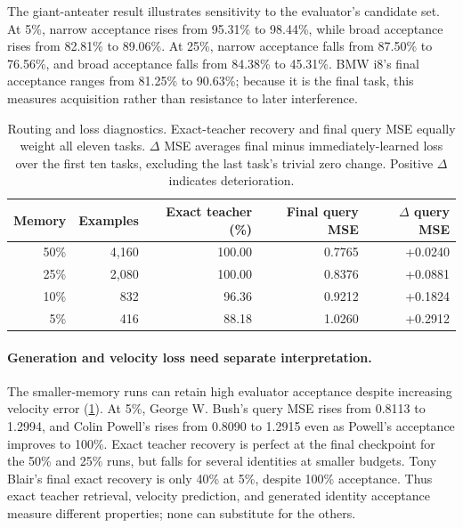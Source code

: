The giant-anteater result illustrates sensitivity to the evaluator's candidate set. At 5\%, narrow acceptance rises from 95.31\% to 98.44\%, while broad acceptance rises from 82.81\% to 89.06\%. At 25\%, narrow acceptance falls from 87.50\% to 76.56\%, and broad acceptance falls from 84.38\% to 45.31\%. BMW i8's final acceptance ranges from 81.25\% to 90.63\%; because it is the final task, this measures acquisition rather than resistance to later interference.

\begin{table}[htbp]\centering\small
\begin{tabular}{rrrrr}\toprule
Memory & Examples & Exact teacher (\%) & Final query MSE & $\Delta$ query MSE\\\midrule
50\% & 4,160 & 100.00 & 0.7765 & +0.0240\\
25\% & 2,080 & 100.00 & 0.8376 & +0.0881\\
10\% & 832 & 96.36 & 0.9212 & +0.1824\\
5\% & 416 & 88.18 & 1.0260 & +0.2912\\
\bottomrule\end{tabular}
\caption{Routing and loss diagnostics. Exact-teacher recovery and final query MSE equally weight all eleven tasks. $\Delta$ MSE averages final minus immediately-learned loss over the first ten tasks, excluding the last task's trivial zero change. Positive $\Delta$ indicates deterioration.}\label{tab:sit_diagnostics}
\end{table}

\paragraph{Generation and velocity loss need separate interpretation.}
The smaller-memory runs can retain high evaluator acceptance despite increasing velocity error (\cref{tab:sit_diagnostics}). At 5\%, George W. Bush's query MSE rises from 0.8113 to 1.2994, and Colin Powell's rises from 0.8090 to 1.2915 even as Powell's acceptance improves to 100\%. Exact teacher recovery is perfect at the final checkpoint for the 50\% and 25\% runs, but falls for several identities at smaller budgets. Tony Blair's final exact recovery is only 40\% at 5\%, despite 100\% acceptance. Thus exact teacher retrieval, velocity prediction, and generated identity acceptance measure different properties; none can substitute for the others.

